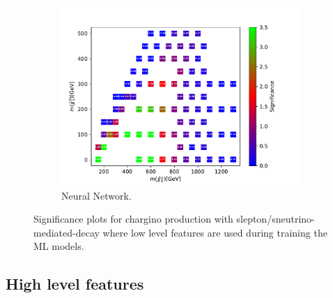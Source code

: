 \begin{figure}[H]
    \begin{subfigure}[t!]{0.49\textwidth}
    \includegraphics[width = \textwidth]{Figures/Significances/significance_NN_slepsnu_Low_level.pdf}
    \caption{Neural Network.}
        \label{fig:signLowslepsnuNN}
    \end{subfigure}
    \caption{Significance plots for chargino production with slepton/sneutrino-mediated-decay where low level features are used during training the ML models.}
    \label{fig:signLowslepsnu}
\end{figure}


\subsection{High level features}

